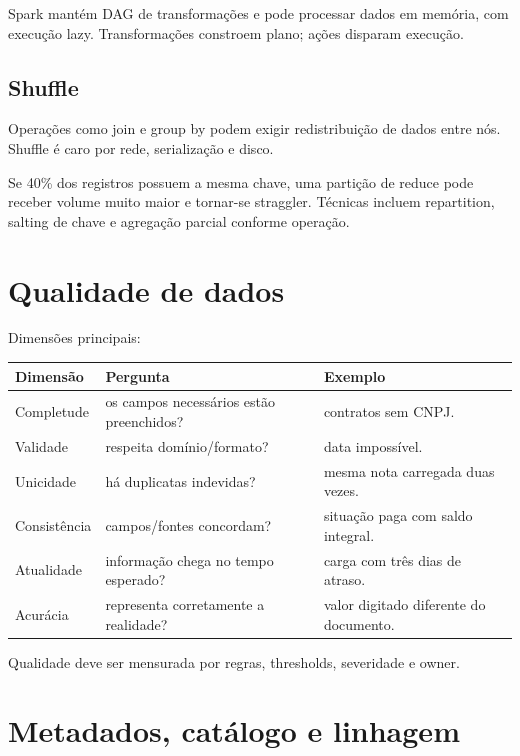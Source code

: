 Spark mantém DAG de transformações e pode processar dados em memória, com execução lazy. Transformações constroem plano; ações disparam execução.

\subsection{Shuffle}

Operações como join e group by podem exigir redistribuição de dados entre nós. Shuffle é caro por rede, serialização e disco.

\begin{exemplo}
Se 40\% dos registros possuem a mesma chave, uma partição de reduce pode receber volume muito maior e tornar-se straggler. Técnicas incluem repartition, salting de chave e agregação parcial conforme operação.
\end{exemplo}

\section{Qualidade de dados}

Dimensões principais:
\begin{table}[ht]
\centering
\small
\begin{tabularx}{\textwidth}{l X X}
\toprule
Dimensão & Pergunta & Exemplo \\
\midrule
Completude & os campos necessários estão preenchidos? & contratos sem CNPJ. \\
Validade & respeita domínio/formato? & data impossível. \\
Unicidade & há duplicatas indevidas? & mesma nota carregada duas vezes. \\
Consistência & campos/fontes concordam? & situação paga com saldo integral. \\
Atualidade & informação chega no tempo esperado? & carga com três dias de atraso. \\
Acurácia & representa corretamente a realidade? & valor digitado diferente do documento. \\
\bottomrule
\end{tabularx}
\end{table}

Qualidade deve ser mensurada por regras, thresholds, severidade e owner.

\section{Metadados, catálogo e linhagem}

